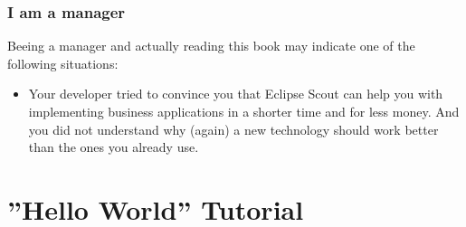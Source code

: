 \documentclass[a4paper,10pt,twoside]{book}
\begin{document}

\subsection{I am a manager}

Beeing a manager and actually reading this book may indicate one of the following situations:

\begin{itemize}
  \item Your developer tried to convince you that Eclipse Scout can help you with implementing business applications in a shorter time and for less money.
        And you did not understand why (again) a new technology should work better than the ones you already use. 
	
\end{itemize}

\chapter{''Hello World'' Tutorial}
\end{document}
